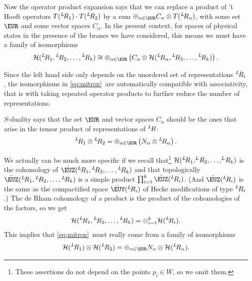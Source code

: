 Now the operator product expansion says that we can replace a
product of 't Hooft operators $T(^L\negthinspace R_1)\cdot
T(^L\negthinspace R_2)$ by a sum $\oplus_{\alpha\in \EUR}C_\alpha\otimes
T(^L\negthinspace R_\alpha)$, with some set $\EUR$ and some
vector spaces $C_\alpha$.  In the present context, for spaces of
physical states in the presence of the branes we have considered,
this means we must have a family of isomorphisms %
\setcounter{equation}{23}
\begin{equation}\label{eq:mitrox}
{\cal
H}({}^L\negthinspace R_1,{}^L\negthinspace
R_2,\dots,{}^L\negthinspace R_k)\cong\oplus_{\alpha\in
\EUR}\left(C_\alpha \otimes{\cal H}({}^L\negthinspace
R_\alpha,{}^L\negthinspace R_3,\dots,{}^L\negthinspace R_k)\right).
\end{equation}

Since the left hand side only depends on the unordered set of
representations $^L\negthinspace R_i$, the isomorphisms in
\eqref{eq:mitrox}\ are automatically compatible with associativity, that is
with taking repeated operator products to further reduce the
number of representations.

$S$-duality says that the set $\EUR$ and vector spaces $C_\alpha$
should be the ones that arise in the tensor product of
representations of $^L\negthinspace R$:
\setcounter{equation}{24}
\begin{equation}\label{eq:omigron}
^L\negthinspace R_1\otimes {}^L\negthinspace
R_2=\oplus_{\alpha\in \EUR}\left(N_\alpha\otimes{} ^L\negthinspace R_\alpha\right).
\end{equation}

We actually can be much more specific if we recall that\footnote{These
assertions do not depend on the points $p_i\in W$, so we omit
them.} ${\cal H}({}^L\negthinspace R_1,^L\negthinspace
R_2,\dots,^L\negthinspace R_k)$ is the cohomology of
$\bar\EUZ({}^L\negthinspace R_1,{}^L\negthinspace
R_2,\dots,{}^L\negthinspace R_k)$  and
that topologically $\bar\EUZ({}^L\negthinspace R_1,{}^L\negthinspace
R_2,\dots,{}^L\negthinspace R_k)$ is a simple product
$\prod_{i=1}^k\bar\EUZ({}^L\negthinspace R_i)$.  (And
$\bar\EUZ({}^L\negthinspace R_i)$ is the same as the compactified
space $\bar {{\EUY}}({}^L\negthinspace R_i)$ of Hecke
modifications of type ${}^L\negthinspace R_i$.)  The de Rham
cohomology of a product is the product of the cohomologies of the
factors, so we get %
\setcounter{equation}{25}
\begin{equation}\label{eq:kipro}
{\cal H}({}^L\negthinspace
R_1,{}^L\negthinspace R_2,\dots,{}^L\negthinspace
R_k)=\otimes_{i=1}^k {\cal H}({}^L\negthinspace R_i).
\end{equation}
 This
implies that \eqref{eq:mitrox}\ must really come from a family of
isomorphisms %
\setcounter{equation}{26}
\begin{equation}\label{eq:gitrox}
{\cal H}({}^L\negthinspace R_1)\otimes
{\cal H}({}^L\negthinspace R_2)=\oplus_{\alpha\in \EUR}N_\alpha\otimes
{\cal H}({}^L\negthinspace R_\alpha).
\end{equation}

